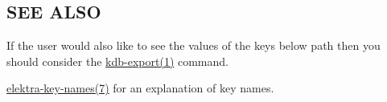 \subsection*{S\+EE A\+L\+SO}


\begin{DoxyItemize}
\item If the user would also like to see the values of the keys below {\ttfamily path} then you should consider the \hyperlink{md_doc_help_kdb-export_doc_help_kdb-export_md}{kdb-\/export(1)} command.
\item \hyperlink{md_doc_help_elektra-key-names_doc_help_elektra-key-names_md}{elektra-\/key-\/names(7)} for an explanation of key names. 
\end{DoxyItemize}